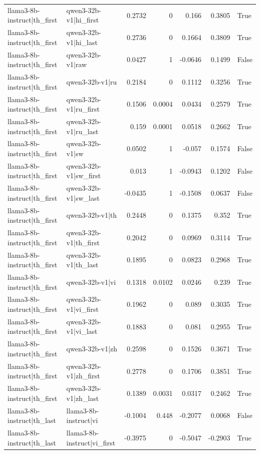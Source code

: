 \begin{table}
\begin{tabular}{l l r r r r l}
llama3-8b-instruct|th_first & qwen3-32b-v1|hi_first & 0.2732 & 0 & 0.166 & 0.3805 & True \\
llama3-8b-instruct|th_first & qwen3-32b-v1|hi_last & 0.2736 & 0 & 0.1664 & 0.3809 & True \\
llama3-8b-instruct|th_first & qwen3-32b-v1|raw & 0.0427 & 1 & -0.0646 & 0.1499 & False \\
llama3-8b-instruct|th_first & qwen3-32b-v1|ru & 0.2184 & 0 & 0.1112 & 0.3256 & True \\
llama3-8b-instruct|th_first & qwen3-32b-v1|ru_first & 0.1506 & 0.0004 & 0.0434 & 0.2579 & True \\
llama3-8b-instruct|th_first & qwen3-32b-v1|ru_last & 0.159 & 0.0001 & 0.0518 & 0.2662 & True \\
llama3-8b-instruct|th_first & qwen3-32b-v1|sw & 0.0502 & 1 & -0.057 & 0.1574 & False \\
llama3-8b-instruct|th_first & qwen3-32b-v1|sw_first & 0.013 & 1 & -0.0943 & 0.1202 & False \\
llama3-8b-instruct|th_first & qwen3-32b-v1|sw_last & -0.0435 & 1 & -0.1508 & 0.0637 & False \\
llama3-8b-instruct|th_first & qwen3-32b-v1|th & 0.2448 & 0 & 0.1375 & 0.352 & True \\
llama3-8b-instruct|th_first & qwen3-32b-v1|th_first & 0.2042 & 0 & 0.0969 & 0.3114 & True \\
llama3-8b-instruct|th_first & qwen3-32b-v1|th_last & 0.1895 & 0 & 0.0823 & 0.2968 & True \\
llama3-8b-instruct|th_first & qwen3-32b-v1|vi & 0.1318 & 0.0102 & 0.0246 & 0.239 & True \\
llama3-8b-instruct|th_first & qwen3-32b-v1|vi_first & 0.1962 & 0 & 0.089 & 0.3035 & True \\
llama3-8b-instruct|th_first & qwen3-32b-v1|vi_last & 0.1883 & 0 & 0.081 & 0.2955 & True \\
llama3-8b-instruct|th_first & qwen3-32b-v1|zh & 0.2598 & 0 & 0.1526 & 0.3671 & True \\
llama3-8b-instruct|th_first & qwen3-32b-v1|zh_first & 0.2778 & 0 & 0.1706 & 0.3851 & True \\
llama3-8b-instruct|th_first & qwen3-32b-v1|zh_last & 0.1389 & 0.0031 & 0.0317 & 0.2462 & True \\
llama3-8b-instruct|th_last & llama3-8b-instruct|vi & -0.1004 & 0.448 & -0.2077 & 0.0068 & False \\
llama3-8b-instruct|th_last & llama3-8b-instruct|vi_first & -0.3975 & 0 & -0.5047 & -0.2903 & True \\

\end{tabular}
\end{table}

